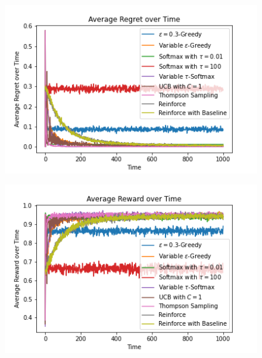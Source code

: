 \documentclass{article}
\begin{document}
		\begin{figure}[H]
		\graphicspath{ {../Experiments/Bernoulli_2_every_case/} }
		\centering
		\begin{minipage}{.5\textwidth}
		  \centering
		  \includegraphics[width=\linewidth]{Average_Regret_over_Time.png}
		  \label{fig:test1}
		\end{minipage}%
		\begin{minipage}{.5\textwidth}
		  \centering
		  \includegraphics[width=\linewidth]{Average_Reward_over_Time.png}
		  \label{fig:test2}
		\end{minipage}
		\end{figure}
		
\end{document}
